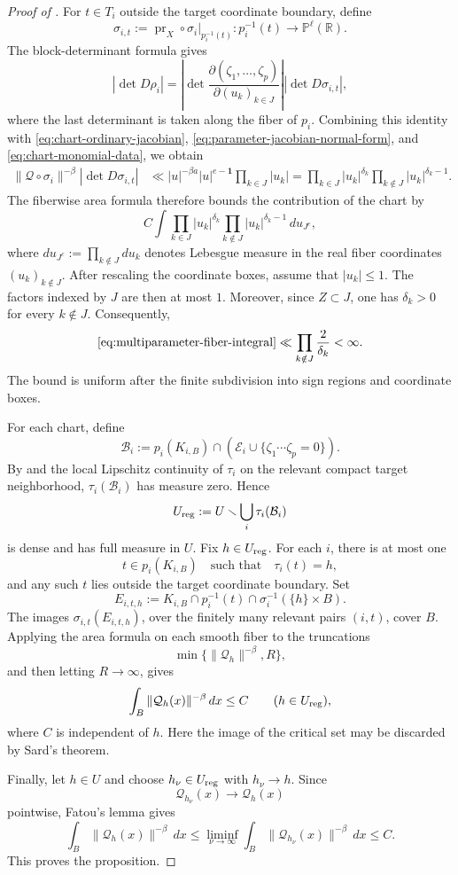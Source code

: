 \documentclass[reqno,11pt]{amsart}
\numberwithin{equation}{section}
\theoremstyle{definition}
\theoremstyle{remark}
\begin{document}
\begin{proof}[Proof of ]
For $t\in T_i$ outside the target coordinate boundary, define
$$
\sigma_{i,t}
:=
\operatorname{pr}_X\circ
\sigma_i|_{p_i^{-1}(t)}
:
p_i^{-1}(t)\to\mathbb P^\ell(\mathbb R).
$$
The block-determinant formula gives
$$
|\det D\rho_i|
=
\left|
\det
\frac{\partial(\zeta_1,\ldots,\zeta_p)}
     {\partial(u_k)_{k\in J}}
\right|
|\det D\sigma_{i,t}|,
$$
where the last determinant is taken along the fiber of $p_i$. Combining
this identity with
\eqref{eq:chart-ordinary-jacobian},
\eqref{eq:parameter-jacobian-normal-form}, and
\eqref{eq:chart-monomial-data}, 
we obtain
$$\begin{aligned}
\|\mathcal Q\circ\sigma_i\|^{-\beta}|\det D\sigma_{i,t}|
&\ll
|u|^{-\beta a}|u|^{e-\mathbf 1}
\prod_{k\in J}|u_k|=
\prod_{k\in J}|u_k|^{\delta_k}
\prod_{k\notin J}|u_k|^{\delta_k-1}.
\end{aligned}$$
The fiberwise area formula therefore bounds the
contribution of the chart by
\begin{equation}\label{eq:multiparameter-fiber-integral}
C
\int
\prod_{k\in J}|u_k|^{\delta_k}
\prod_{k\notin J}|u_k|^{\delta_k-1}
\,du_{J^c},
\end{equation}
where $du_{J^c}:=\prod_{k\notin J}du_k$ denotes Lebesgue measure
in the real fiber coordinates $(u_k)_{k\notin J}$.
After rescaling the coordinate boxes, assume that $|u_k|\le1$. The factors
indexed by $J$ are then at most $1$. Moreover, since $Z\subset J$, one has
$\delta_k>0$ for every $k\notin J$. Consequently,
$$
\eqref{eq:multiparameter-fiber-integral}
\ll
\prod_{k\notin J}\frac{2}{\delta_k}
<\infty.
$$
The bound is uniform after the finite subdivision into sign regions and
coordinate boxes.

For each chart, define
$$
\mathcal B_i
:=
p_i(K_{i,B})\cap
\left(
\mathcal E_i\cup\{\zeta_1\cdots\zeta_p=0\}
\right).
$$
By  and the local Lipschitz
continuity of $\tau_i$ on the relevant compact target neighborhood,
$\tau_i(\mathcal B_i)$ has measure zero. Hence
$$
U_{\rm reg}
:=
U\smallsetminus\bigcup_i\tau_i(\mathcal B_i)
$$
is dense and has full measure in $U$. Fix $h\in U_{\rm reg}$. For each $i$, there is at most one
$$
t\in p_i(K_{i,B})
\quad\text{such that}\quad
\tau_i(t)=h,
$$
and any such $t$ lies outside the target coordinate boundary. Set
$$
E_{i,t,h}
:=
K_{i,B}\cap p_i^{-1}(t)
\cap\sigma_i^{-1}(\{h\}\times B).
$$
The images $\sigma_{i,t}(E_{i,t,h})$, over the finitely many relevant
pairs $(i,t)$, cover $B$. Applying the area formula on each smooth fiber
to the truncations
$$
\min\{\|\mathcal Q_h\|^{-\beta},R\},
$$
and then letting $R\to\infty$, gives
$$
\int_B\|\mathcal Q_h(x)\|^{-\beta}\,dx
\le C
\qquad
(h\in U_{\rm reg}),
$$
where $C$ is independent of $h$. Here the image of the critical set may be
discarded by Sard's theorem.

Finally, let $h\in U$ and choose $h_\nu\in U_{\rm reg}$ with
$h_\nu\to h$. Since
$$
\mathcal Q_{h_\nu}(x)\to\mathcal Q_h(x)
$$
pointwise, Fatou's lemma gives
$$
\int_B\|\mathcal Q_h(x)\|^{-\beta}\,dx
\le
\liminf_{\nu\to\infty}
\int_B\|\mathcal Q_{h_\nu}(x)\|^{-\beta}\,dx
\le C.
$$
This proves the proposition.
\end{proof}
\end{document}
